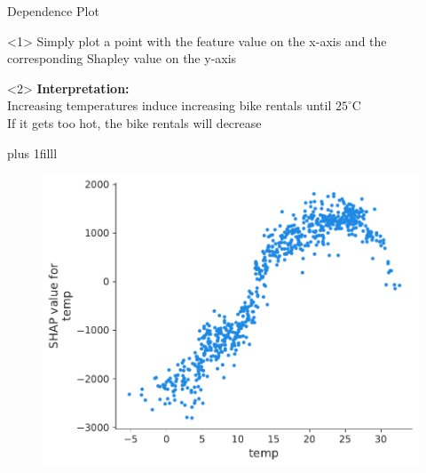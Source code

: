 \documentclass[11pt,compress,t,notes=noshow, aspectratio=169, xcolor=table]{beamer}
\newcommand{\btVFill}{\vskip0pt plus 1filll}
\begin{document}
\begin{vbframe}{Dependence Plot}

\begin{onlyenv}<1>
Simply plot a point with the feature value on the x-axis and the corresponding Shapley value on the y-axis
\end{onlyenv}

\begin{onlyenv}<2>
\textbf{Interpretation:}\\
Increasing temperatures induce increasing bike rentals until $25^\circ\text{C}$ \\
If it gets too hot, the bike rentals will decrease

\end{onlyenv}


\btVFill

\begin{figure}
    \centering
    \includegraphics[width=0.5\columnwidth]{slides/shapley/figure_man/global_shap_depend.pdf}
\end{figure}

\end{vbframe}
\end{document}
